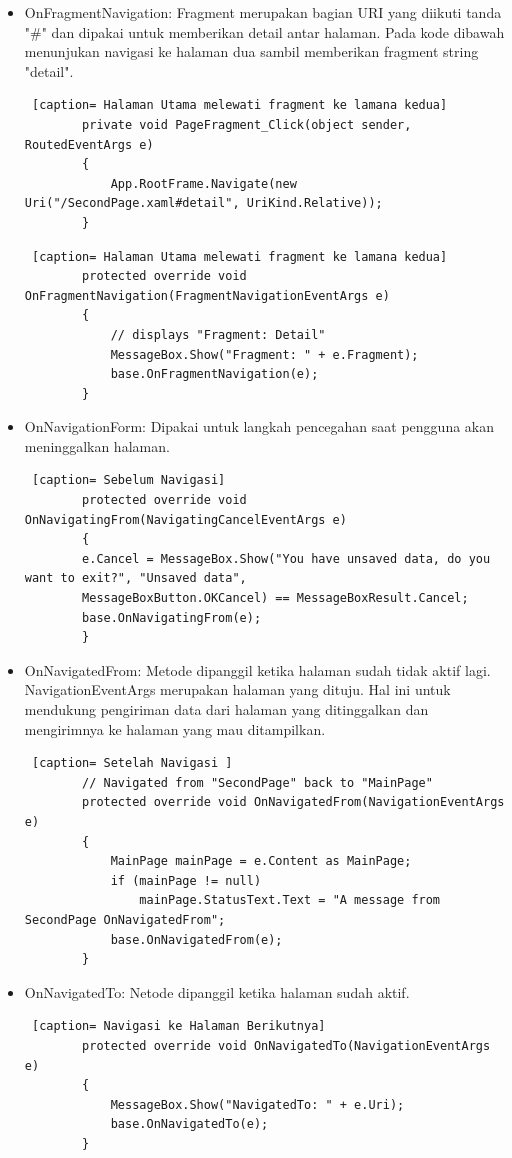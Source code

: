 \begin{itemize}
	\item OnFragmentNavigation: Fragment merupakan bagian URI yang diikuti tanda "\#" dan dipakai untuk memberikan detail antar halaman. Pada kode dibawah menunjukan navigasi ke halaman dua sambil memberikan fragment string "detail".
	
	\begin{lstlisting} [caption= Halaman Utama melewati fragment ke lamana kedua]
		private void PageFragment_Click(object sender, RoutedEventArgs e)
		{
			App.RootFrame.Navigate(new Uri("/SecondPage.xaml#detail", UriKind.Relative));
		}
	\end{lstlisting}
	
	\begin{lstlisting} [caption= Halaman Utama melewati fragment ke lamana kedua]
		protected override void OnFragmentNavigation(FragmentNavigationEventArgs e)
		{
			// displays "Fragment: Detail"
			MessageBox.Show("Fragment: " + e.Fragment);
			base.OnFragmentNavigation(e);
		}
	\end{lstlisting}

	\item OnNavigationForm: Dipakai untuk langkah pencegahan saat pengguna akan meninggalkan halaman.	
	\begin{lstlisting} [caption= Sebelum Navigasi]
		protected override void OnNavigatingFrom(NavigatingCancelEventArgs e)
		{
		e.Cancel = MessageBox.Show("You have unsaved data, do you want to exit?", "Unsaved data",
		MessageBoxButton.OKCancel) == MessageBoxResult.Cancel;
		base.OnNavigatingFrom(e);
		}
	\end{lstlisting}
	
	\item OnNavigatedFrom: Metode dipanggil ketika halaman sudah tidak aktif lagi. NavigationEventArgs merupakan halaman yang dituju. Hal ini untuk mendukung pengiriman data dari halaman yang ditinggalkan dan mengirimnya ke halaman yang mau ditampilkan.
	\begin{lstlisting} [caption= Setelah Navigasi ]
		// Navigated from "SecondPage" back to "MainPage"
		protected override void OnNavigatedFrom(NavigationEventArgs e)
		{
			MainPage mainPage = e.Content as MainPage;
			if (mainPage != null)
				mainPage.StatusText.Text = "A message from SecondPage OnNavigatedFrom";
			base.OnNavigatedFrom(e);
		}
	\end{lstlisting}
	
	\item OnNavigatedTo: Netode dipanggil ketika halaman sudah aktif.
	\begin{lstlisting} [caption= Navigasi ke Halaman Berikutnya]
		protected override void OnNavigatedTo(NavigationEventArgs e)
		{
			MessageBox.Show("NavigatedTo: " + e.Uri);
			base.OnNavigatedTo(e);
		}
	\end{lstlisting}
\end{itemize}

